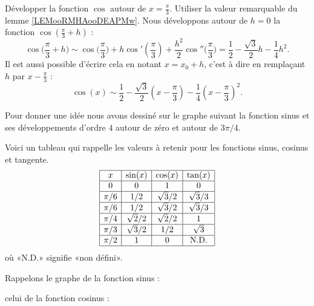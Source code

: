 \begin{example}\label{developcosenpisur3}
    Développer la fonction \( \cos\) autour de \( x=\frac{ \pi }{ 3 }\). Utiliser la valeur remarquable du lemme \ref{LEMooRMHAooDEAPMw}. Nous développons autour de \( h=0\) la fonction \( \cos(\frac{ \pi }{ 3 }+h)\) :
    \begin{equation}
        \cos\big( \frac{ \pi }{ 3 }+h \big)\sim \cos\big( \frac{ \pi }{ 3 } \big)+h\cos'(\frac{ \pi }{ 3 })+\frac{ h^2 }{2}\cos''\big( \frac{ \pi }{ 3 } \big)=\frac{ 1 }{2}-\frac{ \sqrt{3} }{2}h-\frac{1}{ 4 }h^2.
    \end{equation}
    Il est aussi possible d'écrire cela en notant \( x=x_0+h\), c'est à dire en remplaçant \( h\) par \( x-\frac{ \pi }{ 3 }\) :
    \begin{equation}
        \cos(x)\sim\frac{ 1 }{2}-\frac{ \sqrt{3} }{ 2 }(x-\frac{ \pi }{ 3 })-\frac{1}{ 4 }(x-\frac{ \pi }{ 3 })^2.
    \end{equation}
\end{example}

Pour donner une idée nous avons dessiné sur le graphe suivant la fonction sinus et ses développements d'ordre \( 4\) autour de zéro et autour de \( 3\pi/4\).
\begin{center}
   
\end{center}

Voici un tableau qui rappelle les valeurs à retenir pour les fonctions sinus, cosinus et tangente.
\begin{equation}\label{PGooIMQFooTnBdIl}
    \begin{array}[]{|c|c|c|c|}
      \hline
      x&\sin(x)&\cos(x)&\tan(x)\\
      \hline
      0&0&1&0\\
      \hline
      \pi/6&1/2&\sqrt{3}/2&\sqrt{3}/3\\
      \hline
      \pi/6&1/2&\sqrt{3}/2&\sqrt{3}/3\\
      \hline
      \pi/4&\sqrt{2}/2&\sqrt{2}/2&1\\
      \hline
      \pi/3&\sqrt{3}/2&1/2&\sqrt{3}\\
      \hline
      \pi/2&1&0&\text{N.D.}\\
      \hline
    \end{array}
\end{equation}
où «N.D.»  signifie «non défini».

Rappelons le graphe de la fonction sinus :
\begin{center}
   
\end{center}
celui de la fonction cosinus :
\begin{center}
   
\end{center}


